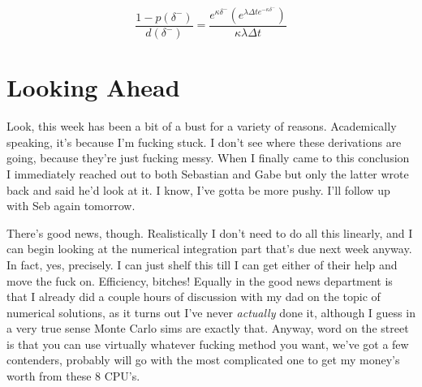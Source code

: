 \documentclass[12pt]{article}
\begin{document}
\[ \frac{1-p(\delta^-)}{d(\delta^-)} = \frac{e^{\kappa \delta^-}\left( e^{\lambda \Delta t e^{-\kappa \delta^-}} \right)}{\kappa\lambda\Delta t} \]

\section*{Looking Ahead}
Look, this week has been a bit of a bust for a variety of reasons. Academically speaking, it's because I'm fucking stuck. I don't see where these derivations are going, because they're just fucking messy. When I finally came to this conclusion I immediately reached out to both Sebastian and Gabe but only the latter wrote back and said he'd look at it. I know, I've gotta be more pushy. I'll follow up with Seb again tomorrow. 

There's good news, though. Realistically I don't need to do all this linearly, and I can begin looking at the numerical integration part that's due next week anyway. In fact, yes, precisely. I can just shelf this till I can get either of their help and move the fuck on. Efficiency, bitches! Equally in the good news department is that I already did a couple hours of discussion with my dad on the topic of numerical solutions, as it turns out I've never \textit{actually} done it, although I guess in a very true sense Monte Carlo sims are exactly that. Anyway, word on the street is that you can use virtually whatever fucking method you want, we've got a few contenders, probably will go with the most complicated one to get my money's worth from these 8 CPU's.
\end{document}
